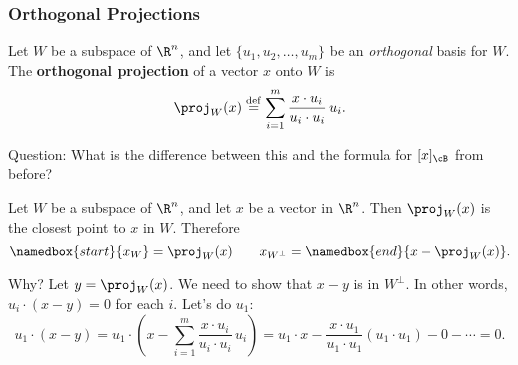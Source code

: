 \begin{frame}
\end{frame}



\begin{frame}
\frametitle{Orthogonal Projections}

\vskip-3mm
\begin{defn}
  Let $W$ be a subspace of $\R^n$, and let $\{u_1,u_2,\ldots,u_m\}$ be an
  \emph{orthogonal} basis for $W$.  The \textbf{orthogonal projection} of a
  vector $x$ onto $W$ is
  \[ \proj_W(x) \overset{\rm def}= \sum_{i=1}^m \frac{x\cdot u_i}{u_i\cdot u_i}\,u_i. \]
\end{defn}

\pause
\alert{Question:} What is the difference between this and the formula for
$[x]_\cB$ from before?

\pause\medskip
\begin{thm}
  Let $W$ be a subspace of $\R^n$, and let $x$ be a vector in $\R^n$.  Then
  $\proj_W(x)$ is the closest point to $x$ in $W$.
  \pause
  Therefore
  \[ \namedbox{start}{x_W} = \proj_W(x) \qquad x_{W^\perp}
  = \namedbox{end}{x-\proj_W(x)}. \]
\end{thm}%
%

\vskip-5mm
\begin{webonly}
\alert{Why?}
Let $y = \proj_W(x)$.  We need to show that $x-y$ is in $W^\perp$.
In other words, $u_i\cdot(x-y)=0$ for each $i$.
Let's do $u_1$:
\[ u_1\cdot(x-y)
= u_1\cdot\left( x-\sum_{i=1}^m\frac{x\cdot u_i}{u_i\cdot u_i}\,u_i \right)
= u_1\cdot x - \frac{x\cdot u_1}{u_1\cdot u_1}(u_1\cdot u_1) - 0 - \cdots
= 0. \]
\end{webonly}

\end{frame}



